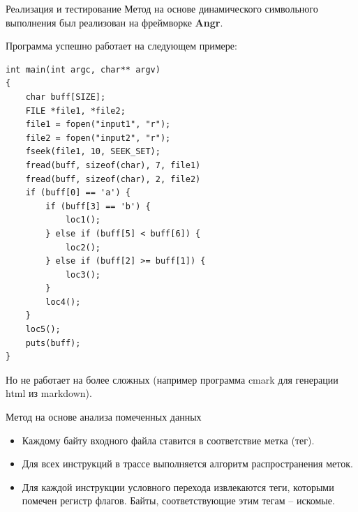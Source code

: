 \documentclass[10pt]{beamer}
\begin{document}

\begin{frame}[fragile]{Реaлизация и тестирование}
Метод на основе динамического символьного выполнения был реализован на фреймворке \textbf{Angr}.

Программа успешно работает на следующем примере:
\begin{lstlisting}[basicstyle=\ttfamily\tiny]
int main(int argc, char** argv)
{
    char buff[SIZE];
    FILE *file1, *file2;
    file1 = fopen("input1", "r");
    file2 = fopen("input2", "r");
    fseek(file1, 10, SEEK_SET);
    fread(buff, sizeof(char), 7, file1)
    fread(buff, sizeof(char), 2, file2)
    if (buff[0] == 'a') {
        if (buff[3] == 'b') {
            loc1();
        } else if (buff[5] < buff[6]) {
            loc2();
        } else if (buff[2] >= buff[1]) {
            loc3();
        }
        loc4();
    }
    loc5();
    puts(buff);
}
\end{lstlisting}
Но не работает на более сложных (например программа cmark для генерации html из markdown).

\end{frame}





\begin{frame}{Метод на основе анализа помеченных данных}

    \begin{itemize}
      \item Каждому байту входного файла ставится в соответствие метка (тег).
      \item Для всех инструкций в трассе выполняется алгоритм распространения меток.
      \item Для каждой инструкции условного перехода извлекаются теги, которыми помечен регистр флагов. Байты, соответствующие этим тегам -- искомые.
    \end{itemize}
\end{frame}
\end{document}
